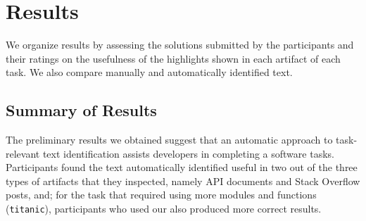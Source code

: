 
\section{Results}
\label{cp6:results}

We organize results by assessing the solutions submitted by the participants
and their ratings on the usefulness of the highlights shown 
in each artifact of each task. We also compare manually and automatically identified text.









\subsection{Summary of Results}


The preliminary results we obtained suggest that 
an automatic approach to task-relevant text identification
assists 
developers in completing a software tasks. 
Participants found the text automatically identified
useful in two out of the three types of artifacts that they inspected, 
namely API documents and Stack Overflow posts, and; 
for the task that required using more modules and functions (\texttt{titanic}),
participants who used our also produced more correct results.




